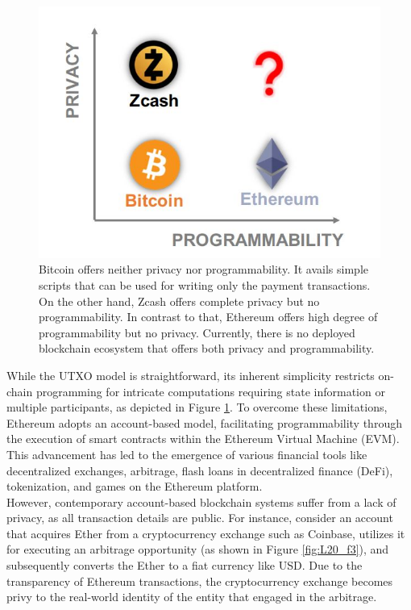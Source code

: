 \begin{center}
	\begin{figure}
		\centering
		\includegraphics[width=0.8\linewidth]{Fig/20/F2}
		\caption{Bitcoin offers neither privacy nor programmability. It avails simple scripts that can be used for writing only the payment transactions. On the other hand, Zcash offers complete privacy but no programmability. In contrast to that, Ethereum offers high degree of programmability but no privacy. Currently, there is no deployed blockchain ecosystem that offers both privacy and programmability.
		}
		\label{fig:L20_f2}
	\end{figure}
\end{center}
While the UTXO model is straightforward, its inherent simplicity restricts on-chain programming for intricate computations requiring state information or multiple participants, as depicted in Figure \ref{fig:L20_f2}. To overcome these limitations, Ethereum adopts an account-based model, facilitating programmability through the execution of smart contracts within the Ethereum Virtual Machine (EVM). This advancement has led to the emergence of various financial tools like decentralized exchanges, arbitrage, flash loans in decentralized finance (DeFi), tokenization, and games on the Ethereum platform.\\
However, contemporary account-based blockchain systems suffer from a lack of privacy, as all transaction details are public. For instance, consider an account that acquires Ether from a cryptocurrency exchange such as Coinbase, utilizes it for executing an arbitrage opportunity (as shown in Figure \ref{fig:L20_f3}), and subsequently converts the Ether to a fiat currency like USD. Due to the transparency of Ethereum transactions, the cryptocurrency exchange becomes privy to the real-world identity of the entity that engaged in the arbitrage.\\
